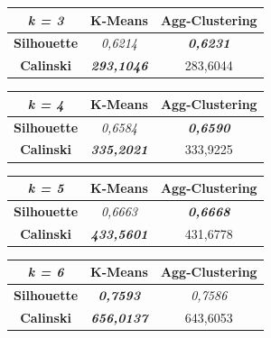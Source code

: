 \begin{table}[H]
\begin{subtable}[H]{0.45\textwidth}
        \centering
\begin{tabular}{|c|c|c|}
\hline
\textit{k = 3}      & \textbf{K-Means}           & \textbf{Agg-Clustering}  \\ \hline
\textbf{Silhouette} & \textit{0,6214}            & \textit{\textbf{0,6231}} \\ \hline
\textbf{Calinski}   & \textit{\textbf{293,1046}} & 283,6044                 \\ \hline
\end{tabular}
\end{subtable}
\hfill
\begin{subtable}[H]{0.45\textwidth}
        \centering
\begin{tabular}{|c|c|c|}
\hline
\textit{k = 4}      & \textbf{K-Means}           & \textbf{Agg-Clustering}  \\ \hline
\textbf{Silhouette} & \textit{0,6584}            & \textit{\textbf{0,6590}} \\ \hline
\textbf{Calinski}   & \textit{\textbf{335,2021}} & 333,9225                 \\ \hline
\end{tabular}
\end{subtable}
\begin{subtable}[H]{0.45\textwidth}
        \centering
\begin{tabular}{|c|c|c|}
\hline
\textit{k = 5}      & \textbf{K-Means}           & \textbf{Agg-Clustering}  \\ \hline
\textbf{Silhouette} & \textit{0,6663}            & \textit{\textbf{0,6668}} \\ \hline
\textbf{Calinski}   & \textit{\textbf{433,5601}} & 431,6778                 \\ \hline
\end{tabular}
\end{subtable}
\hfill
\begin{subtable}[H]{0.45\textwidth}
        \centering
\begin{tabular}{|c|c|c|}
\hline
\textit{k = 6}      & \textbf{K-Means}           & \textbf{Agg-Clustering} \\ \hline
\textbf{Silhouette} & \textit{\textbf{0,7593}}   & \textit{0,7586}         \\ \hline
\textbf{Calinski}   & \textit{\textbf{656,0137}} & 643,6053                \\ \hline
\end{tabular}

\end{subtable}
\end{table}
